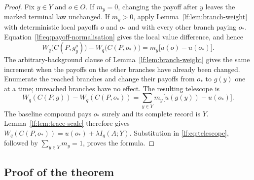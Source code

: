 \begin{proof}
Fix $y\in Y$ and $o\in O$.
If $m_y=0$, changing the payoff after $y$ leaves the marked terminal law
unchanged.  If $m_y>0$, apply Lemma~\ref{lf:lem:branch-weight} with
deterministic local payoffs $o$ and $o_\ast$ and with every other branch paying
$o_\ast$.  Equation~\eqref{lf:eq:payoff-normalisation} gives the local value
difference, and hence
\begin{equation}
W_q\bigl(C(P,g_y^o)\bigr)
-W_q\bigl(C(P,o_\ast)\bigr)
=m_y\bigl[u(o)-u(o_\ast)\bigr].
\label{lf:eq:branch-increment}
\end{equation}
The arbitrary-background clause of Lemma~\ref{lf:lem:branch-weight} gives the
same increment when the payoffs on the other branches have already been
changed.  Enumerate the reached branches and change their payoffs from
$o_\ast$ to $g(y)$ one at a time; unreached branches have no effect.  The
resulting telescope is
\begin{equation}
W_q(C(P,g))-W_q(C(P,o_\ast))
=\sum_{y\in Y}m_y\bigl[u(g(y))-u(o_\ast)\bigr].
\label{lf:eq:telescope}
\end{equation}
The baseline compound pays $o_\ast$ surely and its complete record is $Y$.
Lemma~\ref{lf:lem:trace-scale} therefore gives
$W_q(C(P,o_\ast))=u(o_\ast)+\lambda I_q(A;Y)$.
Substitution in \eqref{lf:eq:telescope}, followed by
$\sum_{y\in Y}m_y=1$, proves the formula.
\end{proof}

\subsection{Proof of the theorem}

